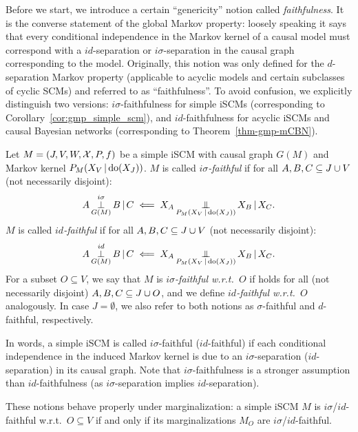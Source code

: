 Before we start, we introduce a certain ``genericity'' notion called \emph{faithfulness}.
It is the converse statement of the global Markov property: loosely speaking it says that
every conditional independence in the Markov kernel of a causal model must correspond with
a $id$-separation or $i\sigma$-separation in the causal graph corresponding to the model.
Originally, this notion was only defined for the $d$-separation Markov property (applicable
to acyclic models and certain subclasses of cyclic SCMs) and referred to as ``faithfulness''.
To avoid confusion, we explicitly distinguish two versions: $i\sigma$-faithfulness for simple iSCMs 
(corresponding to Corollary~\ref{cor:gmp_simple_scm}), and $id$-faithfulness for acyclic iSCMs and
causal Bayesian networks (corresponding to Theorem~\ref{thm-gmp-mCBN}).
\begin{Def}\label{def:faithfulness}
  Let $M = \left ( J, V, W, \mathcal{X}, P, f \right )$ be a simple iSCM with causal graph $G(M)$
  and Markov kernel $P_{M}(X_V \operatorname*{|} \operatorname{do}(X_J))$.
  $M$ is called \emph{$i\sigma$-faithful} if 
  for all $A, B, C \subseteq J \cup V$ (not necessarily disjoint):
  \begin{equation}\label{eq:sigma_faithful}
    A \operatorname*{\perp}^{i\sigma}_{G(M)} B \operatorname*{|} C \impliedby X_A \operatorname*{\perp\mkern-11mu\perp}_{P_{M}(X_V \operatorname*{|} \operatorname{do}(X_{J}))} X_B \operatorname*{|} X_C.
  \end{equation}
  $M$ is called \emph{$id$-faithful} if
  for all $A, B, C \subseteq J \cup V$ (not necessarily disjoint):
  \begin{equation}\label{eq:d_faithful}
    A \operatorname*{\perp}^{id}_{G(M)} B \operatorname*{|} C \impliedby X_A \operatorname*{\perp\mkern-11mu\perp}_{P_{M}(X_V \operatorname*{|} \operatorname{do}(X_{J}))} X_B \operatorname*{|} X_C.
  \end{equation}
  For a subset $O \subseteq V$, we say that $M$ is \emph{$i\sigma$-faithful w.r.t.\ $O$} if
   holds for all (not necessarily disjoint) $A, B, C \subseteq J \cup O$, and we define
  \emph{$id$-faithful w.r.t.\ $O$} analogously.
  In case $J=\emptyset$, we also refer to both notions as $\sigma$-faithful and $d$-faithful, respectively.
\end{Def}
In words, a simple iSCM is called $i\sigma$-faithful ($id$-faithful) if each conditional independence in the induced Markov kernel is due to an $i\sigma$-separation ($id$-separation) in its causal graph.
Note that $i\sigma$-faithfulness is a stronger assumption than $id$-faithfulness (as $i\sigma$-separation implies $id$-separation).
\begin{Rem}
These notions behave properly under marginalization: a simple iSCM $M$ is $i\sigma$/$id$-faithful w.r.t.\ $O \subseteq V$ if and only if
its marginalizations $M_O$ are $i\sigma$/$id$-faithful.
\end{Rem}

